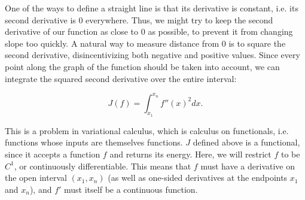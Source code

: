 \documentclass{article}
\begin{document}
One of the ways to define a straight line is that its derivative is constant,
i.e. its second derivative is 0 everywhere.
Thus, we might try to keep the second derivative of our function as close to 0 as possible,
to prevent it from changing slope too quickly.
A natural way to measure distance from 0 is to square the second derivative,
disincentivizing both negative and positive values.
Since every point along the graph of the function should be taken into account,
we can integrate the squared second derivative over the entire interval:

\[J(f) = \int_{x_1}^{x_n}f''(x)^2 dx.\]

This is a problem in variational calculus,
which is calculus on functionals,
i.e. functions whose inputs are themselves functions.
$J$ defined above is a functional,
since it accepts a function $f$ and returns its energy.
Here, we will restrict $f$ to be $C^1$, or continuously differentiable.
This means that $f$ must have a derivative on the open interval $(x_1, x_n)$
(as well as one-sided derivatives at the endpoints $x_1$ and $x_n$),
and $f'$ must itself be a continuous function.
\end{document}
